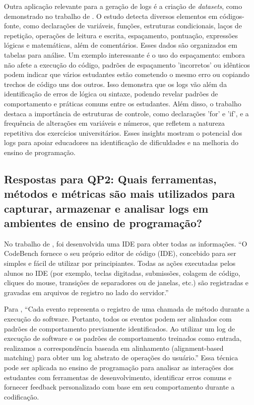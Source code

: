 Outra aplicação relevante para a geração de logs é a criação de \textit{datasets}, como demonstrado no trabalho de \cite{umezawa2020analysis}. O estudo detecta diversos elementos em códigos-fonte, como declarações de variáveis, funções, estruturas condicionais, laços de repetição, operações de leitura e escrita, espaçamento, pontuação, expressões lógicas e matemáticas, além de comentários. Esses dados são organizados em tabelas para análise. Um exemplo interessante é o uso do espaçamento: embora não afete a execução do código, padrões de espaçamento 'incorretos' ou idênticos podem indicar que vários estudantes estão cometendo o mesmo erro ou copiando trechos de código uns dos outros. Isso demonstra que os logs vão além da identificação de erros de lógica ou sintaxe, podendo revelar padrões de comportamento e práticas comuns entre os estudantes. Além disso, o trabalho destaca a importância de estruturas de controle, como declarações 'for' e 'if', e a frequência de alterações em variáveis e números, que refletem a natureza repetitiva dos exercícios universitários. Esses insights mostram o potencial dos logs para apoiar educadores na identificação de dificuldades e na melhoria do ensino de programação.

\subsection{Respostas para QP2: Quais ferramentas, métodos e métricas são mais utilizados para capturar, armazenar e analisar logs em ambientes de ensino de programação?} \label{respostas-qp2}

No trabalho de \cite{pereira2020using}, foi desenvolvida uma IDE para obter todas as informações. ``O CodeBench fornece o seu próprio editor de código (IDE), concebido para ser simples e fácil de utilizar por principiantes. Todas as ações executadas pelos alunos no IDE (por exemplo, teclas digitadas, submissões, colagem de código, cliques do mouse, transições de separadores ou de janelas, etc.) são registradas e gravadas em arquivos de registro no lado do servidor.''

Para \cite{liu2018user}, ``Cada evento representa o registro de uma chamada de método durante a execução do software. Portanto, todos os eventos podem ser alinhados com padrões de comportamento previamente identificados. Ao utilizar um log de execução de software e os padrões de comportamento treinados como entrada, realizamos a correspondência baseada em alinhamento (alignment-based matching) para obter um log abstrato de operações do usuário.'' Essa técnica pode ser aplicada no ensino de programação para analisar as interações dos estudantes com ferramentas de desenvolvimento, identificar erros comuns e fornecer feedback personalizado com base em seu comportamento durante a codificação.

